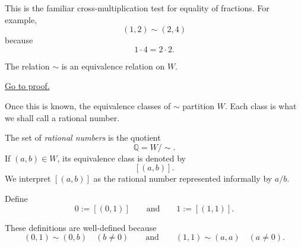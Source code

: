 \begin{remark}
This is the familiar cross-multiplication test for equality of fractions.  For example,
\[
(1,2)\sim(2,4)
\]
because
\[
1\cdot 4 = 2\cdot 2.
\]
\end{remark}

\begin{theorem}
\label{thm:fraction-pair-equivalence}
The relation $\sim$ is an equivalence relation on $W$.
\end{theorem}

\begin{remark*}[Proof]
\hyperref[prf:fraction-pair-equivalence]{Go to proof.}
\end{remark*}

\begin{remark}
Once this is known, the equivalence classes of $\sim$ partition $W$.  Each class is what we shall
call a rational number.
\end{remark}

\begin{definition}
\label{def:rational-numbers}

The set of \emph{rational numbers} is the quotient
\[
\mathbb{Q} = W/\sim.
\]
If $(a,b)\in W$, its equivalence class is denoted by
\[
[(a,b)].
\]
We interpret $[(a,b)]$ as the rational number represented informally by $a/b$.

\end{definition}

\begin{definition}
\label{def:rational-distinguished}

Define
\[
0 := [(0,1)]
\qquad\text{and}\qquad
1 := [(1,1)].
\]

\end{definition}

\begin{remark}
These definitions are well-defined because
\[
(0,1)\sim(0,b) \quad (b\neq 0)
\qquad\text{and}\qquad
(1,1)\sim(a,a) \quad (a\neq 0).
\]
\end{remark}

